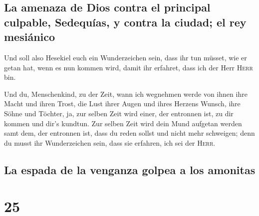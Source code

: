 \hypertarget{la-amenaza-de-dios-contra-el-principal-culpable-sedequuxedas-y-contra-la-ciudad-el-rey-mesiuxe1nico}{%
\subsection{La amenaza de Dios contra el principal culpable, Sedequías,
y contra la ciudad; el rey
mesiánico}\label{la-amenaza-de-dios-contra-el-principal-culpable-sedequuxedas-y-contra-la-ciudad-el-rey-mesiuxe1nico}}

 Und soll also Hesekiel euch ein Wunderzeichen sein, dass
ihr tun müsset, wie er getan hat, wenn es nun kommen wird, damit ihr
erfahret, dass ich der Herr \textsc{Herr} bin.

 Und du, Menschenkind, zu der Zeit, wann ich wegnehmen
werde von ihnen ihre Macht und ihren Trost, die Lust ihrer Augen und
ihres Herzens Wunsch, ihre Söhne und Töchter,  ja, zur
selben Zeit wird einer, der entronnen ist, zu dir kommen und dir's
kundtun.  Zur selben Zeit wird dein Mund aufgetan werden
samt dem, der entronnen ist, dass du reden sollst und nicht mehr
schweigen; denn du musst ihr Wunderzeichen sein, dass sie erfahren, ich
sei der \textsc{Herr}.

\hypertarget{la-espada-de-la-venganza-golpea-a-los-amonitas}{%
\subsection{La espada de la venganza golpea a los
amonitas}\label{la-espada-de-la-venganza-golpea-a-los-amonitas}}

\hypertarget{section-24}{%
\section{25}\label{section-24}}

